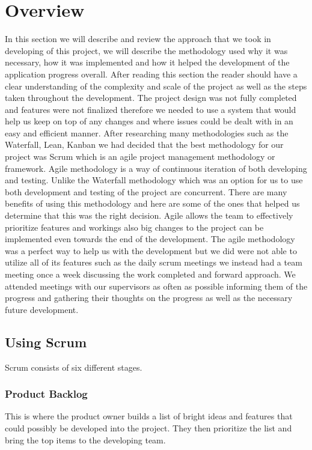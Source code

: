 \documentclass[a4paper,12pt]{report}
\begin{document}
\section{Overview}
In this section we will describe and review the approach that we took in developing of this project, we will describe the methodology used why it was necessary, how it was implemented and how it helped the development of the application progress overall.
After reading this section the reader should have a clear understanding of the complexity and scale of the project as well as the steps taken throughout the development.
The project design was not fully completed and features were not finalized therefore we needed to use a system that would help us keep on top of any changes and where issues could be dealt with in an easy and efficient manner.
After researching many methodologies such as the Waterfall, Lean, Kanban we had decided that the best methodology for our project was Scrum which is an agile project management methodology or framework.
Agile methodology is a way of continuous iteration of both developing and testing. Unlike the Waterfall methodology which was an option for us to use both development and testing of the project are concurrent. 
There are many benefits of using this methodology and here are some of the ones that helped us determine that this was the right decision.
Agile allows the team to effectively prioritize features and workings also big changes to the project can be implemented even towards the end of the development.\cite{agileResearch}
\newpage
The agile methodology was a perfect way to help us with the development but we did were not able to utilize all of its features such as the daily scrum meetings we instead had a team meeting once a week discussing the work completed and forward approach. We attended meetings with our supervisors as often as possible informing them of the progress and gathering their thoughts on the progress as well as the necessary future development.   

\subsection{Using Scrum}
Scrum consists of six different stages.
\subsubsection{Product Backlog}
This is where the product owner builds a list of bright ideas and features that could possibly be developed into the project.
They then prioritize the list and bring the top items to the developing team.
\end{document}
